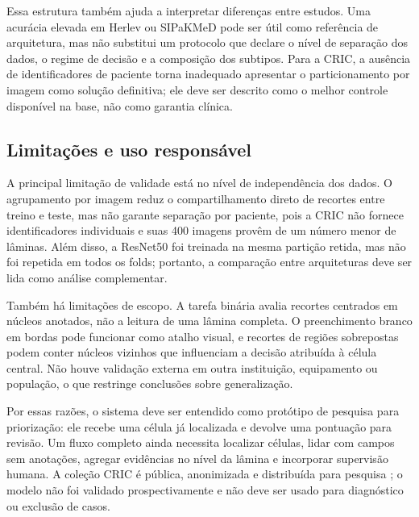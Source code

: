 Essa estrutura também ajuda a interpretar diferenças entre estudos. Uma
acurácia elevada em Herlev ou SIPaKMeD pode ser útil como referência de
arquitetura, mas não substitui um protocolo que declare o nível de separação
dos dados, o regime de decisão e a composição dos subtipos. Para a CRIC, a
ausência de identificadores de paciente torna inadequado apresentar o
particionamento por imagem como solução definitiva; ele deve ser descrito como
o melhor controle disponível na base, não como garantia clínica.

\subsection{Limitações e uso responsável}

A principal limitação de validade está no nível de independência dos dados. O
agrupamento por imagem reduz o compartilhamento direto de recortes entre treino
e teste, mas não garante separação por paciente, pois a CRIC não fornece
identificadores individuais e suas 400 imagens provêm de um número menor de
lâminas. Além disso, a ResNet50 foi treinada na mesma partição retida, mas não
foi repetida em todos os folds; portanto, a comparação entre arquiteturas deve
ser lida como análise complementar.

Também há limitações de escopo. A tarefa binária avalia recortes centrados em
núcleos anotados, não a leitura de uma lâmina completa. O preenchimento branco
em bordas pode funcionar como atalho visual, e recortes de regiões sobrepostas
podem conter núcleos vizinhos que influenciam a decisão atribuída à célula
central. Não houve validação externa em outra instituição, equipamento ou
população, o que restringe conclusões sobre generalização.

Por essas razões, o sistema deve ser entendido como protótipo de pesquisa para
priorização: ele recebe uma célula já localizada e devolve uma pontuação para
revisão. Um fluxo completo ainda necessita localizar células, lidar com campos
sem anotações, agregar evidências no nível da lâmina e incorporar supervisão
humana. A coleção CRIC é pública, anonimizada e distribuída para pesquisa
\cite{rezende2021cric}; o modelo não foi validado prospectivamente e não deve
ser usado para diagnóstico ou exclusão de casos.
